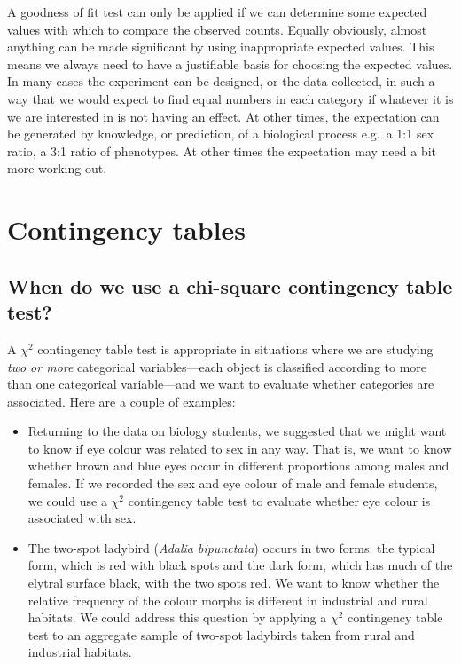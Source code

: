 \documentclass[
]{book}
\begin{document}
A goodness of fit test can only be applied if we can determine some expected values with which to compare the observed counts. Equally obviously, almost anything can be made significant by using inappropriate expected values. This means we always need to have a justifiable basis for choosing the expected values. In many cases the experiment can be designed, or the data collected, in such a way that we would expect to find equal numbers in each category if whatever it is we are interested in is not having an effect. At other times, the expectation can be generated by knowledge, or prediction, of a biological process e.g.~a 1:1 sex ratio, a 3:1 ratio of phenotypes. At other times the expectation may need a bit more working out.

\hypertarget{contingency-tables}{%
\chapter{Contingency tables}\label{contingency-tables}}

\hypertarget{when-do-we-use-a-chi-square-contingency-table-test}{%
\section{When do we use a chi-square contingency table test?}\label{when-do-we-use-a-chi-square-contingency-table-test}}

A \(\chi^{2}\) contingency table test is appropriate in situations where we are studying \emph{two or more} categorical variables---each object is classified according to more than one categorical variable---and we want to evaluate whether categories are associated. Here are a couple of examples:

\begin{itemize}
\item
  Returning to the data on biology students, we suggested that we might want to know if eye colour was related to sex in any way. That is, we want to know whether brown and blue eyes occur in different proportions among males and females. If we recorded the sex and eye colour of male and female students, we could use a \(\chi^{2}\) contingency table test to evaluate whether eye colour is associated with sex.
\item
  The two-spot ladybird (\emph{Adalia bipunctata}) occurs in two forms: the typical form, which is red with black spots and the dark form, which has much of the elytral surface black, with the two spots red. We want to know whether the relative frequency of the colour morphs is different in industrial and rural habitats. We could address this question by applying a \(\chi^{2}\) contingency table test to an aggregate sample of two-spot ladybirds taken from rural and industrial habitats.
\end{itemize}
\end{document}
